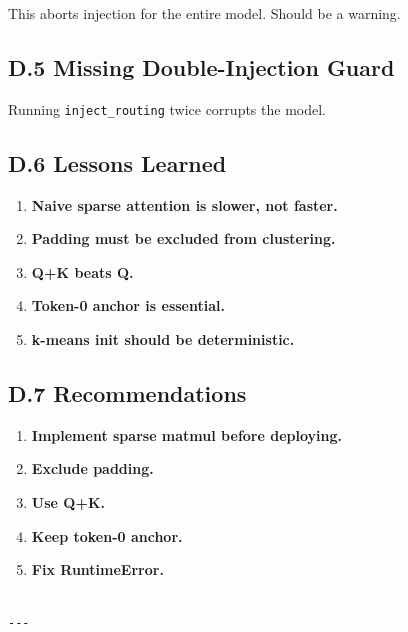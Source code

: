This aborts injection for the entire model. Should be a warning.

\subsection{D.5 Missing Double-Injection Guard}

Running \texttt{inject\_routing} twice corrupts the model.

\subsection{D.6 Lessons Learned}

\begin{enumerate}
\item \textbf{Naive sparse attention is slower, not faster.}
\item \textbf{Padding must be excluded from clustering.}
\item \textbf{Q+K beats Q.}
\item \textbf{Token-0 anchor is essential.}
\item \textbf{k-means init should be deterministic.}

\end{enumerate}
\subsection{D.7 Recommendations}

\begin{enumerate}
\item \textbf{Implement sparse matmul before deploying.}
\item \textbf{Exclude padding.}
\item \textbf{Use Q+K.}
\item \textbf{Keep token-0 anchor.}
\item \textbf{Fix RuntimeError.}
\end{enumerate}
\begin{lstlisting}

---
\end{lstlisting}